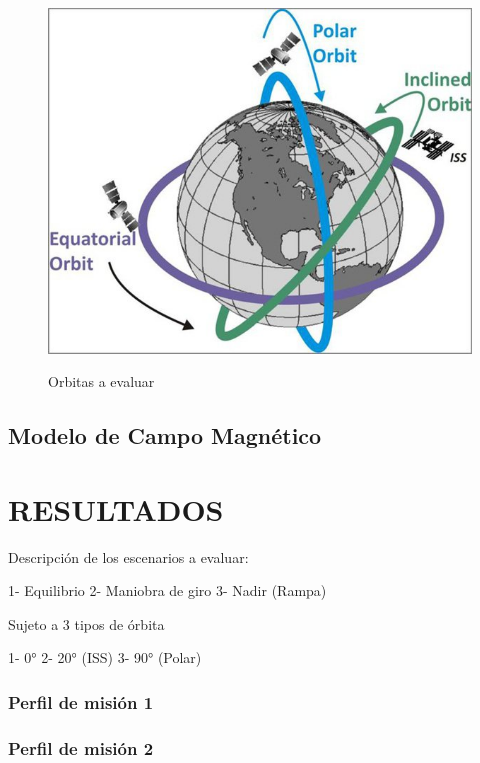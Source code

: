\begin{figure}[h]
	\begin{center}
		\includegraphics[scale=0.4]{imagenes/analisis_de_orbitas/orbitas.jpg}\\
	\end{center}
	\caption{Orbitas a evaluar}
	\label{fig:orbitas}
	\textit{}
\end{figure}


\subsection{Modelo de Campo Magnético}




\newpage
\section{RESULTADOS}

Descripción de los escenarios a evaluar:

1- Equilibrio  
2- Maniobra de giro
3- Nadir (Rampa)

Sujeto a 3 tipos de órbita 

1- 0°
2- 20° (ISS)
3- 90° (Polar)

\subsubsection{Perfil de misión 1}
\subsubsection{Perfil de misión 2} 
